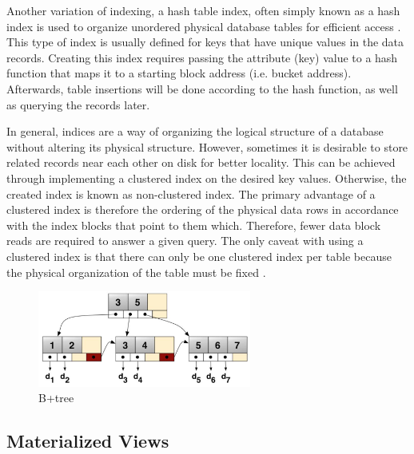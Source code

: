 \documentclass[12pt,a4paper]{article}
\begin{document}
Another variation of indexing, a hash table index, often simply known as a hash index is used to organize unordered physical database tables for efficient
access \cite{lightstone2007physical}. This type of index is usually defined for keys that have unique values in the data records. Creating this index requires
passing the attribute (key) value to a hash function that maps it to a starting block address (i.e. bucket address). Afterwards, table insertions will be done
according to the hash function, as well as querying the records later.

In general, indices are a way of organizing the logical structure of a database without altering its physical structure. However, sometimes it is desirable to
store related records near each other on disk for better locality. This can be achieved through implementing a clustered index on the desired key values.
Otherwise, the created index is known as non-clustered index. The primary advantage of a clustered index is therefore the ordering of the physical data rows in
accordance with the index blocks that point to them which. Therefore, fewer data block reads are required to answer a given query. The only caveat with using a
clustered index is that there can only be one clustered index per table because the physical organization of the table must be fixed
\cite{lightstone2007physical}.

\begin{figure}[!t]
\centering
\includegraphics[width=7cm]{figs/b+tree.png}
\caption{B+tree}
\label{fig:b+tree}
\end{figure}

\subsection{Materialized Views}
\end{document}
